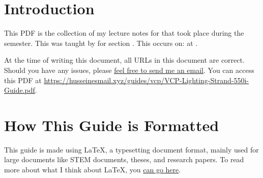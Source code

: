 \graphicspath{{./}}     %


\lstset{        %
  basicstyle=\ttfamily,
  frame=single,
  breaklines=true
}
\maketitle              %
\newpage                %
\tableofcontents        %
\newpage                %

\section{Introduction}
This PDF is the collection of my lecture notes for \myCourseCode{} that took place during the \myCourseSemester{} semester. This was taught by \myCourseProf{} for section \myCourseSection{}. This occurs on: \myCourseSchedule{} at \myCourseLocation{}.

At the time of writing this document, all URLs in this document are correct. Should you have any issues, please \underline{\href{mailto:HusseinEsmailContact@gmail.com}{feel free to send me an email}}. You can access this PDF at \underline{\href{https://husseinesmail.xyz/guides/vcp/VCP-Lighting-Strand-550i-Guide.pdf}{https://husseinesmail.xyz/guides/vcp/VCP-Lighting-Strand-550i-Guide.pdf}}.

\section{How This Guide is Formatted}
This guide is made using \LaTeX{}, a typesetting document format, mainly used for large documents like STEM documents, theses, and research papers. To read more about what I think about \LaTeX{}, you \href{https://husseinesmail.xyz/articles/is-latex-better.html}{can go here}.





